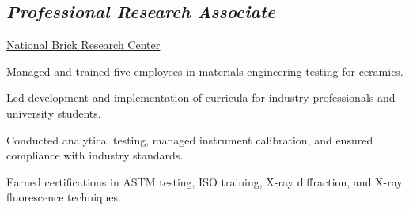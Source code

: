 \subsection{\textit{Professional Research Associate}}
\begin{cvtable}
        {\color{cvsectioncolor}\href{https://brickandtile.org/}{\underline{National Brick Research Center}}}
        {}
        {\begin{tightitemize}
            \item Managed and trained five employees in materials engineering testing for ceramics.
            \item Led development and implementation of curricula for industry professionals and university students.
            \item Conducted analytical testing, managed instrument calibration, and ensured compliance with industry standards.
            \item Earned certifications in ASTM testing, ISO training, X-ray diffraction, and X-ray fluorescence techniques.
        \end{tightitemize}}
\end{cvtable}